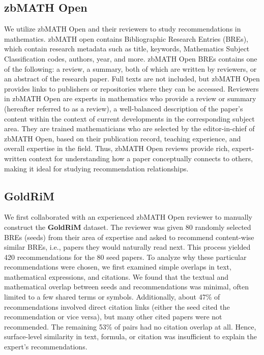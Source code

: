 \documentclass[sigconf,anonymous]{acmart}
\begin{document}
\subsection{zbMATH Open}
We utilize zbMATH Open and their reviewers to study recommendations in mathematics.
zbMATH open contains Bibliographic Research Entries (BREs), which contain research metadata such as title, keywords, Mathematics Subject Classification codes, authors, year, and more.
zbMATH Open BREs contains one of the following: a review, a summary, both of which are written by reviewers, or an abstract of the research paper.
Full texts are not included, but zbMATH Open provides links to publishers or repositories where they can be accessed.
Reviewers in zbMATH Open are experts in mathematics who provide a review or summary (hereafter referred to as a review), a well-balanced description of the paper's content within the context of current developments in the corresponding subject area. 
They are trained mathematicians who are selected by the editor-in-chief of zbMATH Open, based on their publication record, teaching experience, and overall expertise in the field.
Thus, zbMATH Open reviews provide rich, expert-written context for understanding how a paper conceptually connects to others, making it ideal for studying recommendation relationships.

\subsection{GoldRiM}
We first collaborated with an experienced zbMATH Open reviewer to manually construct the \textbf{GoldRiM} dataset.
The reviewer was given 80 randomly selected BREs (seeds) from their area of expertise and asked to recommend content-wise similar BREs, i.e., papers they would naturally read next.
This process yielded 420 recommendations for the 80 seed papers.
To analyze why these particular recommendations were chosen, we first examined simple overlaps in text, mathematical expressions, and citations.
We found that the textual and mathematical overlap between seeds and recommendations was minimal, often limited to a few shared terms or symbols.
Additionally, about 47\% of recommendations involved direct citation links (either the seed cited the recommendation or vice versa), but many other cited papers were not recommended.
The remaining 53\% of pairs had no citation overlap at all.
Hence, surface-level similarity in text, formula, or citation was insufficient to explain the expert’s recommendations.
\end{document}
